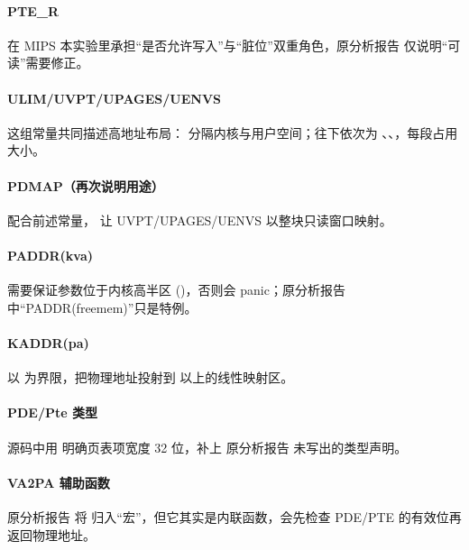 \documentclass[12pt,oneside]{ctexbook}
\begin{document}
\paragraph{PTE\_R}
在 MIPS 本实验里承担“是否允许写入”与“脏位”双重角色，原分析报告 仅说明“可读”需要修正。

\paragraph{ULIM/UVPT/UPAGES/UENVS}
这组常量共同描述高地址布局： 分隔内核与用户空间；往下依次为 、、，每段占用  大小。

\paragraph{PDMAP（再次说明用途）}
配合前述常量， 让 UVPT/UPAGES/UENVS 以整块只读窗口映射。

\paragraph{PADDR(kva)}
需要保证参数位于内核高半区 ()，否则会 panic；原分析报告 中“PADDR(freemem)”只是特例。

\paragraph{KADDR(pa)}
以  为界限，把物理地址投射到  以上的线性映射区。

\paragraph{PDE/Pte 类型}
源码中用  明确页表项宽度 32 位，补上 原分析报告 未写出的类型声明。

\paragraph{VA2PA 辅助函数}
原分析报告 将  归入“宏”，但它其实是内联函数，会先检查 PDE/PTE 的有效位再返回物理地址。
\end{document}

